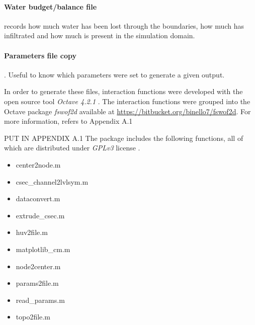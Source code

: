 \paragraph{Water budget/balance file} records how much water has been lost through the boundaries, how much has infiltrated and how much is present in the simulation domain.
\paragraph{Parameters file copy}. Useful to know which parameters were set to generate a given output.

In order to generate these files, interaction functions were developed with the open source tool \textit{Octave 4.2.1} \autocite{octave_community_gnu_2018}. The interaction functions were grouped into the Octave package \textit{fswof2d} available at \url{https://bitbucket.org/binello7/fswof2d}. For more information, refers to  Appendix A.1


PUT IN APPENDIX A.1 
The package includes the following functions, all of which are distributed under \textit {GPLv3} license \autocite{smith_quick_2014}.
 
\begin{itemize}
\itemsep0em
  \item center2node.m
  \item csec\_channel2lvlsym.m
  \item dataconvert.m
  \item extrude\_csec.m
  \item huv2file.m
  \item matplotlib\_cm.m
  \item node2center.m
  \item params2file.m
  \item read\_params.m
  \item topo2file.m
\end{itemize}







